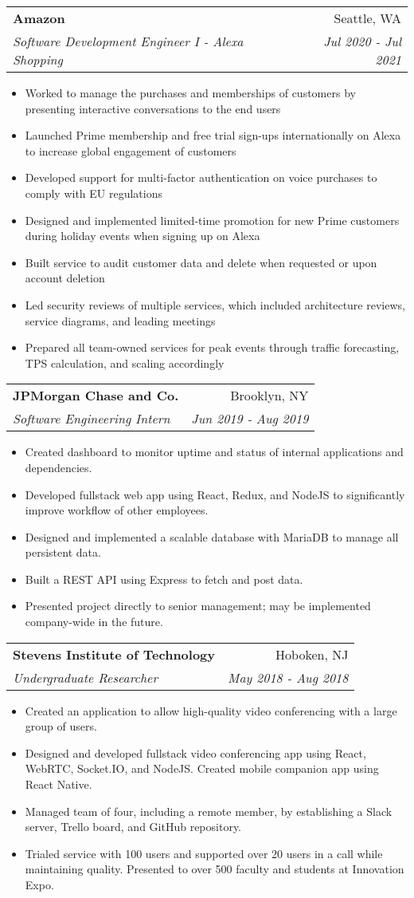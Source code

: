 \documentclass[letterpaper,11pt]{article}
\makeatletter
\newcommand{\resumeItem}[1]{
  \item\small{
    {#1 \vspace{-2pt}}
  }
}
\newcommand{\resumeSubheading}[4]{
  \vspace{-1pt}\item
    \begin{tabular*}{0.97\textwidth}{l@{\extracolsep{\fill}}r}
      \textbf{#1} & #2 \\
      \textit{\small#3} & \textit{\small #4} \\
    \end{tabular*}\vspace{-5pt}
}
\newcommand{\resumeItemListStart}{\begin{itemize}}
\newcommand{\resumeItemListEnd}{\end{itemize}\vspace{-5pt}}
\makeatother
\begin{document}
    \resumeSubheading
      {Amazon}{Seattle, WA}
      {Software Development Engineer I - Alexa Shopping}{Jul 2020 - Jul 2021}
      \resumeItemListStart
        \resumeItem
          {Worked to manage the purchases and memberships of customers by presenting interactive conversations to the end users}
        \resumeItem
          {Launched Prime membership and free trial sign-ups internationally on Alexa to increase global engagement of customers}
        \resumeItem
          {Developed support for multi-factor authentication on voice purchases to comply with EU regulations}
        \resumeItem
          {Designed and implemented limited-time promotion for new Prime customers during holiday events when signing up on Alexa}
        \resumeItem
          {Built service to audit customer data and delete when requested or upon account deletion}
        \resumeItem
          {Led security reviews of multiple services, which included architecture reviews, service diagrams, and leading meetings}
        \resumeItem
          {Prepared all team-owned services for peak events through traffic forecasting, TPS calculation, and scaling accordingly}
      \resumeItemListEnd

    \resumeSubheading
      {JPMorgan Chase and Co.}{Brooklyn, NY}
      {Software Engineering Intern}{Jun 2019 - Aug 2019}
      \resumeItemListStart
        \resumeItem
          {Created dashboard to monitor uptime and status of internal applications and dependencies.}
        \resumeItem
          {Developed fullstack web app using React, Redux, and NodeJS to significantly improve workflow of other employees.}
        \resumeItem
          {Designed and implemented a scalable database with MariaDB to manage all persistent data.}
        \resumeItem
          {Built a REST API using Express to fetch and post data.}
        \resumeItem
          {Presented project directly to senior management; may be implemented company-wide in the future.}
      \resumeItemListEnd

    \resumeSubheading
      {Stevens Institute of Technology}{Hoboken, NJ}
      {Undergraduate Researcher}{May 2018 - Aug 2018}
      \resumeItemListStart
        \resumeItem
          {Created an application to allow high-quality video conferencing with a large group of users.}
        \resumeItem
          {Designed and developed fullstack video conferencing app using React, WebRTC, Socket.IO, and NodeJS. Created mobile companion app using React Native.}
        \resumeItem
          {Managed team of four, including a remote member, by establishing a Slack server, Trello board, and GitHub repository.}
        \resumeItem
          {Trialed service with 100 users and supported over 20 users in a call while maintaining quality. Presented to over 500 faculty and students at Innovation Expo.}
      \resumeItemListEnd
      
\end{document}
